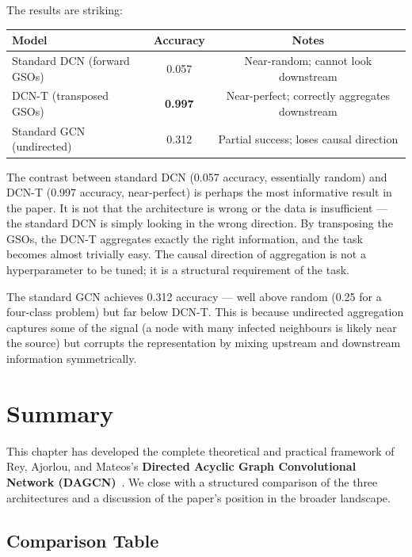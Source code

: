 The results are striking:

\begin{center}
\begin{tabular}{lcc}
\toprule
\textbf{Model} & \textbf{Accuracy} & \textbf{Notes} \\
\midrule
Standard DCN (forward GSOs) & 0.057 & Near-random; cannot look downstream \\
DCN-T (transposed GSOs) & \textbf{0.997} & Near-perfect; correctly aggregates downstream \\
Standard GCN (undirected) & 0.312 & Partial success; loses causal direction \\
\bottomrule
\end{tabular}
\end{center}

The contrast between standard DCN (0.057 accuracy, essentially random) and
DCN-T (0.997 accuracy, near-perfect) is perhaps the most informative result
in the paper. It is not that the architecture is wrong or the data is
insufficient --- the standard DCN is simply looking in the wrong direction. By
transposing the GSOs, the DCN-T aggregates exactly the right information, and
the task becomes almost trivially easy. The causal direction of aggregation is
not a hyperparameter to be tuned; it is a structural requirement of the task.

The standard GCN achieves 0.312 accuracy --- well above random (0.25 for a
four-class problem) but far below DCN-T. This is because undirected aggregation
captures some of the signal (a node with many infected neighbours is likely
near the source) but corrupts the representation by mixing upstream and
downstream information symmetrically.

\section{Summary}
\label{sec:dagcn_summary}

This chapter has developed the complete theoretical and practical framework
of Rey, Ajorlou, and Mateos's \textbf{Directed Acyclic Graph Convolutional
Network (DAGCN)}~\cite{rey2025dagcn}. We close with a structured comparison
of the three architectures and a discussion of the paper's position in the
broader landscape.

\subsection{Comparison Table}

